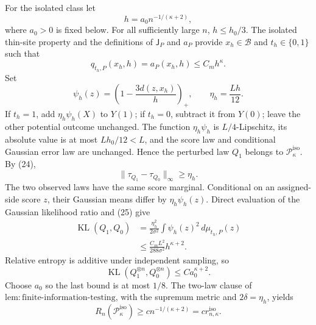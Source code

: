 For the isolated class let
\[
 h=a_0n^{-1/(\kappa+2)},
\]
where \(a_0>0\) is fixed below. For all sufficiently large \(n\), \(h\le h_0/3\). The isolated thin-site property and the definitions of \(\mathsf J_P\) and \(a_P\) provide \(x_h\in\mathcal B\) and \(t_h\in\{0,1\}\) such that
\[
 q_{t_h,P}(x_h,h)=a_P(x_h,h)\le C_mh^{\kappa}. \tag{25}
\]
Set
\[
 \psi_h(z)=\left(1-\frac{3d(z,x_h)}h\right)_+,
 \qquad \eta_h=\frac{Lh}{12}.
\]
If \(t_h=1\), add \(\eta_h\psi_h(X)\) to \(Y(1)\); if \(t_h=0\), subtract it from \(Y(0)\); leave the other potential outcome unchanged. The function \(\eta_h\psi_h\) is \(L/4\)-Lipschitz, its absolute value is at most \(Lh_0/12<L\), and the score law and conditional Gaussian error law are unchanged. Hence the perturbed law \(Q_1\) belongs to \(\mathcal P_{\kappa}^{\mathrm{iso}}\). By (24),
\[
 \lVert\tau_{Q_1}-\tau_{Q_0}\rVert_{\infty}\ge\eta_h. \tag{26}
\]
The two observed laws have the same score marginal. Conditional on an assigned-side score \(z\), their Gaussian means differ by \(\eta_h\psi_h(z)\). Direct evaluation of the Gaussian likelihood ratio and (25) give
\[
 \begin{aligned}
 \operatorname{KL}(Q_1,Q_0)
 &=\frac{\eta_h^2}{2\sigma^2}
   \int\psi_h(z)^2\,d\mu_{t_h,P}(z)\\
 &\le\frac{C_mL^2}{288\sigma^2}h^{\kappa+2}. 
 \end{aligned} \tag{27}
\]
Relative entropy is additive under independent sampling, so
\[
 \operatorname{KL}(Q_1^{\otimes n},Q_0^{\otimes n})
 \le C a_0^{\kappa+2}.
\]
Choose \(a_0\) so the last bound is at most \(1/8\). The two-law clause of \(\mathrm{lem:finite\text{-}information\text{-}testing}\), with the supremum metric and \(2\delta=\eta_h\), yields
\[
 R_n(\mathcal P_{\kappa}^{\mathrm{iso}})
 \ge c n^{-1/(\kappa+2)}
 =c r_{n,\kappa}^{\mathrm{iso}}. \tag{28}
\]

